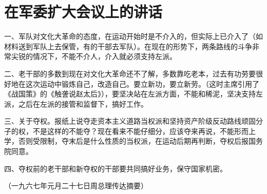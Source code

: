 \section[在军委扩大会议上的讲话（一九六七年一月二十七日）]{在军委扩大会议上的讲话}


一、军队对文化大革命的态度，在运动开始时是不介入的，但实际上已介入了（如材料送到军队上去保管，有的干部去军队）。在现在的形势下，两条路线的斗争非常尖锐的情况下，不能不介人，介入就必须支持左派。

二、老干部的多数到现在对文化大革命还不了解，多数靠吃老本，过去有功劳要很好地在这次运动中锻炼自己，改造自己。要立新功，要立新劳。（这时主席引用了《战国策》的《触詟说赵太后》），要坚决站在左派方面，不能和稀泥，坚决支持左派，之后在左派的接管和监督下，搞好工作。

三、关于夺权。报纸上说夺走资本主义道路当权派和坚持资产阶级反动路线顽固分子的权，不是这样的不能夺？现在看来不能仔细分，应该夺来再说，不能形而上学，否则受限制，夺末后是什么性质的当权派，在运动后期再判断，夺权后报国务院同意。

四、夺权前的老干部和新夺权的干部要共同搞好业务，保守国家机密。

{\raggedleft （一九六七年元月二十七日周总理传达摘要）\par}


